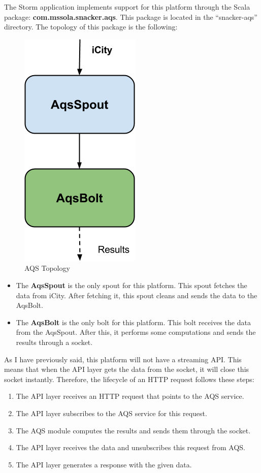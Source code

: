 The Storm application implements support for this platform through the Scala
package: {\bf com.mssola.snacker.aqs}. This package is located in the
``snacker-aqs'' directory. The topology of this package is the following:

\begin{figure}
  \centering
  \includegraphics[scale=0.6]{implementation/images/aqs.png}
  \caption{AQS Topology}\label{fig:aqs_topology}
\end{figure}

\begin{itemize}
  \itemsep0em
  \item The {\bf AqsSpout} is the only spout for this platform. This spout
fetches the data from iCity. After fetching it, this spout cleans and sends the
data to the AqsBolt.
  \item The {\bf AqsBolt} is the only bolt for this platform. This bolt
receives the data from the AqsSpout. After this, it performs some computations
and sends the results through a socket.
\end{itemize}

As I have previously said, this platform will not have a streaming \ac{API}.
This means that when the \ac{API} layer gets the data from the socket, it will
close this socket instantly. Therefore, the lifecycle of an HTTP request follows
these steps:

\begin{enumerate}
  \itemsep0em
  \item The \ac{API} layer receives an HTTP request that points to the AQS
service.
  \item The \ac{API} layer subscribes to the AQS service for this request.
  \item The AQS module computes the results and sends them through the socket.
  \item The \ac{API} layer receives the data and unsubscribes this request from
AQS.
  \item The \ac{API} layer generates a response with the given data.
\end{enumerate}

